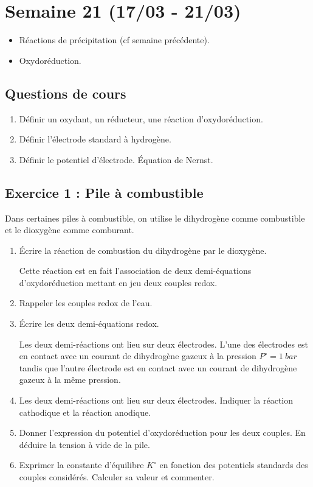 \section{Semaine 21 (17/03 - 21/03) }


\begin{itemize}
	\item Réactions de précipitation (cf semaine précédente).
	\item Oxydoréduction.
\end{itemize}

\subsection{Questions de cours}

\begin{enumerate}
	\item Définir un oxydant, un réducteur, une réaction d'oxydoréduction.
	\item Définir l'électrode standard à hydrogène.
	\item Définir le potentiel d'électrode. Équation de Nernst.
\end{enumerate}


\subsection{Exercice 1 : Pile à combustible}

Dans certaines piles à combustible, on utilise le dihydrogène comme combustible et le dioxygène comme comburant. 

\begin{enumerate}
	\item Écrire la réaction de combustion du dihydrogène par le dioxygène.
	
	Cette réaction est en fait l'association de deux demi-équations d'oxydoréduction mettant en jeu deux couples redox.
	
	\item Rappeler les couples redox de l'eau. 
	\item Écrire les deux demi-équations redox.
	
	Les deux demi-réactions ont lieu sur deux électrodes. L'une des électrodes est en contact avec un courant de dihydrogène gazeux à la pression $P^\circ = \SI{1}{bar}$ tandis que l'autre électrode est en contact avec un courant de dihydrogène gazeux à la même pression.
	
	\item Les deux demi-réactions ont lieu sur deux électrodes. Indiquer la réaction cathodique et la réaction anodique.
	\item Donner l'expression du potentiel d'oxydoréduction pour les deux couples. En déduire la tension à vide de la pile.
	\item Exprimer la constante d'équilibre $K^\circ$ en fonction des potentiels standards des couples considérés. Calculer sa valeur et commenter.
\end{enumerate}

